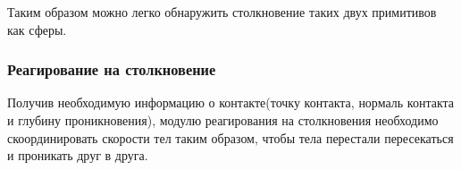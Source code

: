 Таким образом можно легко обнаружить столкновение таких двух примитивов как сферы.
\subsubsection{Реагирование на столкновение}
Получив необходимую информацию о контакте(точку контакта, нормаль контакта и глубину проникновения), модулю реагирования
на столкновения необходимо скоординировать скорости тел таким образом, чтобы тела перестали пересекаться и проникать друг в друга.  
